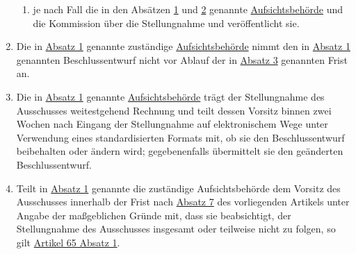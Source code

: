\begin{enumerate}
\begin{enumerate}
    \item je nach Fall die in den Absätzen \hyperref[itm:64-1]{1} und \hyperref[itm:64-2]{2} genannte \hyperref
     [itm:04-21]{Aufsichtsbehörde} und die Kommission über die Stellungnahme und veröffentlicht sie.
    \label{itm:64-5b}

  \end{enumerate}

  \item Die in \hyperref[itm:64-1]{Absatz 1} genannte zuständige \hyperref[itm:04-21]{Aufsichtsbehörde} nimmt den in
   \hyperref[itm:64-1]{Absatz 1} genannten Beschlussentwurf nicht vor Ablauf der in \hyperref[itm:64-3]{Absatz 3}
    genannten Frist an.
  \label{itm:64-6}

  \item Die in \hyperref[itm:64-1]{Absatz 1} genannte \hyperref[itm:04-21]{Aufsichtsbehörde} trägt der Stellungnahme des
   Ausschusses weitestgehend Rechnung und teilt dessen Vorsitz binnen zwei Wochen nach Eingang der Stellungnahme auf
   elektronischem Wege unter Verwendung eines standardisierten Formats mit, ob sie den Beschlussentwurf beibehalten
   oder ändern wird; gegebenenfalls übermittelt sie den geänderten Beschlussentwurf.
  \label{itm:64-7}

  \item Teilt in \hyperref[itm:64-1]{Absatz 1} genannte die zuständige Aufsichtsbehörde dem Vorsitz des Ausschusses
   innerhalb der Frist nach \hyperref[itm:64-7]{Absatz 7} des vorliegenden Artikels unter Angabe der maßgeblichen
   Gründe mit, dass sie beabsichtigt, der Stellungnahme des Ausschusses insgesamt oder teilweise nicht zu folgen, so
   gilt \hyperref[itm:65-2]{Artikel 65 Absatz 1}.
  \label{itm:64-8}

\end{enumerate}


